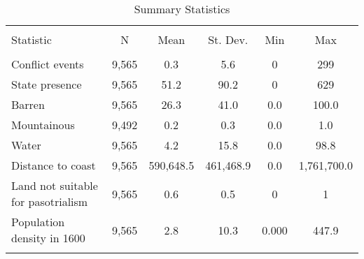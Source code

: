 
\begin{sidewaystable}[!htbp] \centering 
  \caption{Summary Statistics} 
  \label{summarystats} 
\begin{tabular}{@{\extracolsep{1pt}}lccccc} 
\\[-1.8ex]\hline 
\hline \\[-1.8ex] 
Statistic & \multicolumn{1}{c}{N} & \multicolumn{1}{c}{Mean} & \multicolumn{1}{c}{St. Dev.} & \multicolumn{1}{c}{Min} & \multicolumn{1}{c}{Max} \\ 
\hline \\[-1.8ex] 
Conflict events & 9,565 & 0.3 & 5.6 & 0 & 299 \\ 
State presence & 9,565 & 51.2 & 90.2 & 0 & 629 \\ 
Barren & 9,565 & 26.3 & 41.0 & 0.0 & 100.0 \\ 
Mountainous & 9,492 & 0.2 & 0.3 & 0.0 & 1.0 \\ 
Water & 9,565 & 4.2 & 15.8 & 0.0 & 98.8 \\ 
Distance to coast & 9,565 & 590,648.5 & 461,468.9 & 0.0 & 1,761,700.0 \\ 
Land not suitable for pasotrialism & 9,565 & 0.6 & 0.5 & 0 & 1 \\ 
Population density in 1600 & 9,565 & 2.8 & 10.3 & 0.000 & 447.9 \\ 
\hline \\[-1.8ex] 
\end{tabular} 
\end{sidewaystable} 

